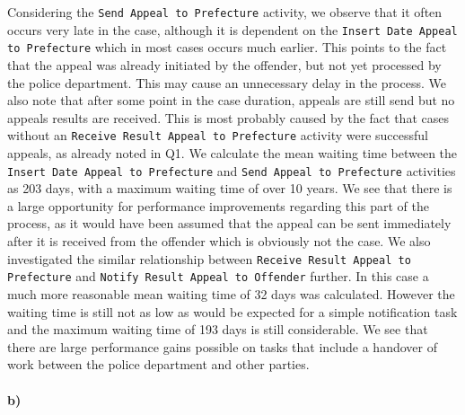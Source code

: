 \documentclass[12pt]{report}
\begin{document}
Considering the \texttt{Send Appeal to Prefecture} activity, we observe that it often occurs very late in the case, although it is dependent on the \texttt{Insert Date Appeal to Prefecture} which in most cases occurs much earlier. This points to the fact that the appeal was already initiated by the offender, but not yet processed by the police department. This may cause an unnecessary delay in the process. We also note that after some point in the case duration, appeals are still send but no appeals results are received. This is most probably caused by the fact that cases without an \texttt{Receive Result Appeal to Prefecture} activity were successful appeals, as already noted in Q1. We calculate the mean waiting time between the \texttt{Insert Date Appeal to Prefecture} and \texttt{Send Appeal to Prefecture} activities as 203 days, with a maximum waiting time of over 10 years. We see that there is a large opportunity for performance improvements regarding this part of the process, as it would have been assumed that the appeal can be sent immediately after it is received from the offender which is obviously not the case. We also investigated the similar relationship between \texttt{Receive Result Appeal to Prefecture} and \texttt{Notify Result Appeal to Offender} further. In this case a much more reasonable mean waiting time of 32 days was calculated. However the waiting time is still not as low as would be expected for a simple notification task and the maximum waiting time of 193 days is still considerable. We see that there are large performance gains possible on tasks that include a handover of work between the police department and other parties. 

\paragraph{\textbf{b)}}
\end{document}
